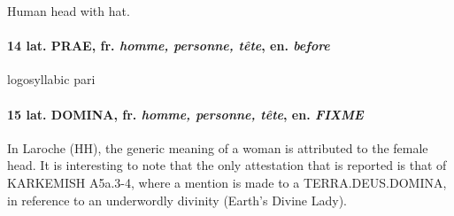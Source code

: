 {Human head with hat.

 
\paragraph{\bfseries\large *14  {\mdseries\small lat.} PRAE, \mdseries \small fr. \textit{homme, personne, tête}, en. \textit{before}} 
\mbox{}
\smallskip

logosyllabic pari


\paragraph{\bfseries\large *15  {\mdseries\small lat.} DOMINA, \mdseries \small fr. \textit{homme, personne, tête}, en. \textit{FIXME}} 
\mbox{}
\smallskip

In Laroche (HH), the generic meaning of a woman is attributed to the female head. It is interesting to note that the only attestation that is reported is that of KARKEMISH A5a.3-4, where a mention is made to a TERRA.DEUS.DOMINA, in reference to an underwordly divinity (Earth's Divine Lady).
}

  
 
 
\def\avis{%
\bgroup
$\stackrel{\stackrel{\scalebox{2}{\anatolian\char"1449A}}{\mbox{\small\arial \textsc{AVIS}}}}{\mbox{128}}$
\egroup
} 
 
\def\avisii{%
\bgroup
$\stackrel{\stackrel{\scalebox{2}{\anatolian\char"1449B}}{\mbox{\small\arial \textsc{AVIS2}}}}{\mbox{128}}$
\egroup
} 

\def\avisiii{%
\bgroup
$\stackrel{\stackrel{\scalebox{2}{\anatolian\char"1449C}}{\mbox{\small\arial \textsc{AVIS3}}}}{\mbox{128}}$
\egroup
} 

\def\avisiv{%
\bgroup
$\stackrel{\stackrel{\scalebox{2}{\anatolian\char"1449D}}{\mbox{\small\arial \textsc{AVIS\textsubscript{4}}}}}{\mbox{128}}$
\egroup
} 

\def\avisv{%
\bgroup
$\stackrel{\stackrel{\scalebox{2}{\anatolian\char"1449E}}{\mbox{\small\arial \textsc{AVIS5}}}}{\mbox{128}}$
\egroup
} 

\def\domina{%
\bgroup
$\stackrel{\stackrel{\scalebox{2}{\anatolian\char"1440F}}{\mbox{\small\arial \textsc{DOMINA}}}}{\mbox{\arial 15}}$
\egroup
}

\def\defanatolian#1#2#3{%
  \expandafter\gdef\csname#1\endcsname{%
    $\stackrel{\stackrel{\scalebox{2}{\anatolian\char #2}}{\mbox{\strut\small\ttfamily \uppercase{#1}}}}{\mbox{\ttfamily #3}}$
  }%
}


